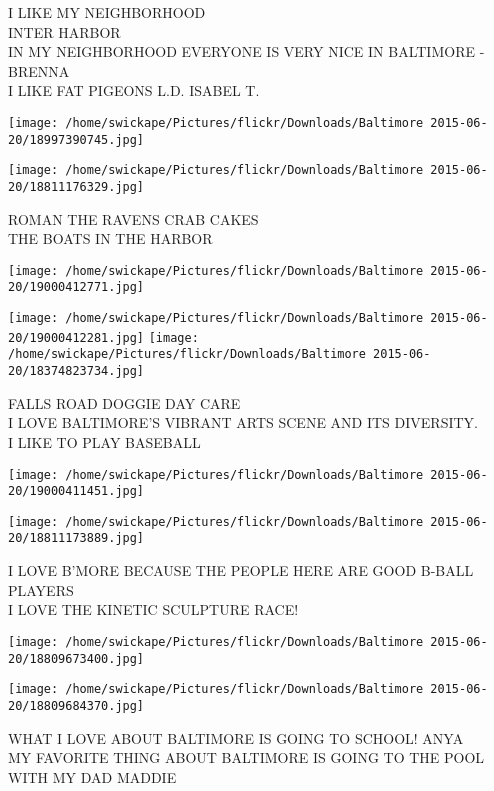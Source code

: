 \documentclass[10pt,letterpaper]{article}
\begin{document}
I LIKE MY NEIGHBORHOOD\\
INTER HARBOR\\
IN MY NEIGHBORHOOD EVERYONE IS VERY NICE IN BALTIMORE {-} BRENNA\\
I LIKE FAT PIGEONS L.D. ISABEL T.
\pagebreak

\texttt{[image: /home/swickape/Pictures/flickr/Downloads/Baltimore 2015-06-20/18997390745.jpg]}

\vspace{0.25in}
\texttt{[image: /home/swickape/Pictures/flickr/Downloads/Baltimore 2015-06-20/18811176329.jpg]}

ROMAN THE RAVENS CRAB CAKES\\
THE BOATS IN THE HARBOR
\pagebreak

\texttt{[image: /home/swickape/Pictures/flickr/Downloads/Baltimore 2015-06-20/19000412771.jpg]}

\vspace{0.25in}
\texttt{[image: /home/swickape/Pictures/flickr/Downloads/Baltimore 2015-06-20/19000412281.jpg]}
\texttt{[image: /home/swickape/Pictures/flickr/Downloads/Baltimore 2015-06-20/18374823734.jpg]}

FALLS ROAD DOGGIE DAY CARE\\
I LOVE BALTIMORE'S VIBRANT ARTS SCENE AND ITS DIVERSITY.\\
I LIKE TO PLAY BASEBALL
\pagebreak

\texttt{[image: /home/swickape/Pictures/flickr/Downloads/Baltimore 2015-06-20/19000411451.jpg]}

\vspace{0.25in}
\texttt{[image: /home/swickape/Pictures/flickr/Downloads/Baltimore 2015-06-20/18811173889.jpg]}

I LOVE B'MORE BECAUSE THE PEOPLE HERE ARE GOOD B{-}BALL PLAYERS\\
I LOVE THE KINETIC SCULPTURE RACE!
\pagebreak

\texttt{[image: /home/swickape/Pictures/flickr/Downloads/Baltimore 2015-06-20/18809673400.jpg]}

\vspace{0.25in}
\texttt{[image: /home/swickape/Pictures/flickr/Downloads/Baltimore 2015-06-20/18809684370.jpg]}

WHAT I LOVE ABOUT BALTIMORE IS GOING TO SCHOOL!  ANYA\\
MY FAVORITE THING ABOUT BALTIMORE IS GOING TO THE POOL WITH MY DAD MADDIE
\pagebreak
\end{document}
